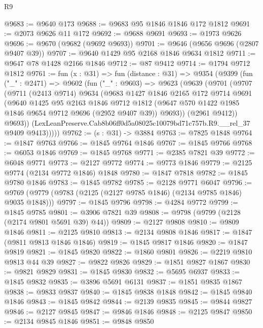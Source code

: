 \begin{lexlean}{R9}
\begin{coremodule}
@9683 := @9640 @173
@9688 := @9683 @95 @1846 @1846 @172 @1812
@9691 := @2073 @9626 @11 @172
@9692 := @9688 @9691
@9693 := @1973 @9626
@9696 := @9670 (@9682 (@9692 @9693))
@9701 := @9646 (@9656 @9696 (@2807 @9407 @39))
@9707 := @9640 @1429 @95 @2168 @1846 @9634 @1812
@9711 := @9647 @78 @1428 @2166 @1846
@9712 := @87 @9412
@9714 := @1794 @9712 @1812
@9761 := fun (x : @31) =>
  fun (distance : @31) =>
  @9354
    (@9399
      (fun ("_" : @2471) =>
      @9602
        (fun ("_" : @9603) =>
        @9623
          (@9639
            (@9701
              (@9707
                (@9711
                  (@2413 @9714)
                  @9634
                  (@9683
                    @1427
                    @1846
                    @2165
                    @172
                    @9714
                    @9691
                    (@9640
                      @1425
                      @95
                      @2163
                      @1846
                      @9712
                      @1812
                      (@9647 @570 @1422 @1985 @1846 @9654 @9712 @9696 (@2952 @9407 @39))
                      @9693))
                  (@2961 @9412))
                @9693))
            (LexLeanPreserve.Cab8b06ff0d5a08025c10079bd71c757b.R9.__rel_37 @9409 @9413)))))
@9762 := (s : @31) -> @3884
@9763 := @7825 @1848
@9764 := @1847 @9763
@9766 := @1845 @9764 @1846
@9767 := @1845 @9766
@9768 := @6053 @1846
@9769 := @1845 @9768
@9771 := @2385 @7821 @39
@9772 := @6048 @9771
@9773 := @2127 @9772
@9774 := @9773 @1846
@9779 := @2125 @9774 (@2134 @9772 @1846) @1848
@9780 := @1847 @7818
@9782 := @1845 @9780 @1846
@9783 := @1845 @9782
@9785 := @2128 @9771 @6047
@9796 := @9769 (@9779 (@9783 (@2125 (@2127 @9785 @1846) (@2134 @9785 @1846) @9035 @1848)))
@9797 := @1845 @9796
@9798 := @4284 @9772
@9799 := @1845 @9785
@9801 := @3906 @7821 @39
@9808 := @9798 (@9799 (@2128 (@2174 @9801 @5691 @39) @44))
@9809 := @2127 @9808
@9810 := @9809 @1846
@9811 := @2125 @9810
@9813 := @2134 @9808 @1846
@9817 := @1847 (@9811 @9813 @1846 @1846)
@9819 := @1845 @9817 @1846
@9820 := @1847 @9819
@9821 := @1845 @9820
@9822 := @1860 @9801
@9826 := @2219 @9810 @9813 @44 @39
@9827 := @9822 @9826
@9829 := @1851 @9827 @1867
@9830 := @9821 @9829
@9831 := @1845 @9830
@9832 := @5695 @6937
@9833 := @1845 @9832
@9835 := @3896 @5691 @6131
@9837 := @1851 @9835 @1867
@9838 := @9833 @9837
@9840 := @1845 @9838 @1848
@9842 := @1845 @9840 @1846
@9843 := @1845 @9842
@9844 := @2139 @9835
@9845 := @9844 @9827
@9846 := @2127 @9845
@9847 := @9846 @1846
@9848 := @2125 @9847
@9850 := @2134 @9845 @1846
@9851 := @9848 @9850

\end{coremodule}
\end{lexlean}
